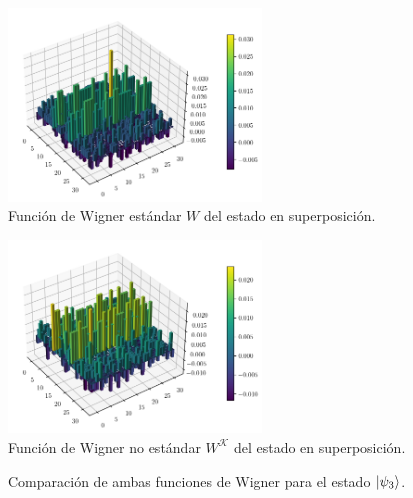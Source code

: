 \documentclass[a4paper,11pt]{report}
\begin{document}
  \begin{figure}[ht]
    \centering
    \includegraphics[width=0.6\textwidth]{
    imgs/wigner-standard-2-5-s3.png}
    \caption{ Función de Wigner estándar $W$ del estado en
    superposición.}
    \label{fig:wigner-standard-2-5-s3}
  \end{figure}
  \begin{figure}[ht]
    \centering
    \includegraphics[width=0.6\textwidth]{
    imgs/wigner-kantor-2-5-s3.png}
    \caption{ Función de Wigner no estándar $W^{\mathcal K}$
    del estado en superposición.}
    \label{fig:wigner-kantor-2-5-s3}
  \end{figure}

  \begin{figure}
    \centering
    \quad
    \caption{Comparación de ambas funciones de Wigner para
    el estado $\ket{\psi_3}$.}
    \label{fig:wigner-2-5-s3-heat}
  \end{figure}
\end{document}
